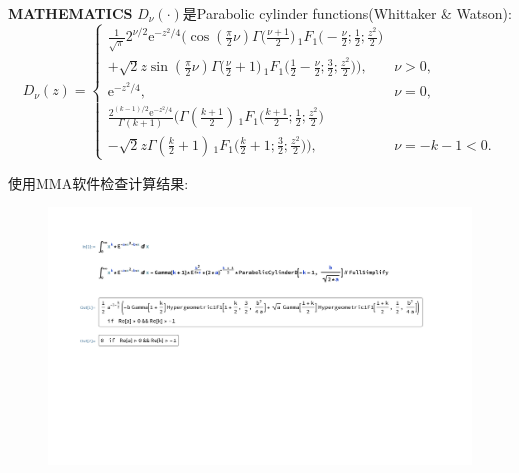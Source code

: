 \documentclass[aspectratio=169]{beamer}
\begin{document}
\begin{frame}{\textbf{{\LARGE{M}}ATHEMATICS}}
	$D_{\nu}(\cdot)$是Parabolic cylinder functions(Whittaker \& Watson):
	\begin{equation}
		D_{\nu}(z)=\begin{cases}
 \frac{1}{\sqrt{\pi}}2^{\nu/2}\mathrm{e}^{-z^2/4}\bigg( \cos(\frac{\pi}{2}\nu)\Gamma\Big(\frac{\nu+1}{2}\Big)\,_1F_1\Big(-\frac{\nu}{2};\frac{1}{2};\frac{z^2}{2}\Big)\\
		+\sqrt{2}z\sin(\frac{\pi}{2}\nu)\Gamma\Big(\frac{\nu}{2}+1\Big)\,_1F_1\Big(\frac{1}{2} - \frac{\nu}{2};\frac{3}{2};\frac{z^2}{2}\Big)\bigg),~~&\nu > 0,\\
		\mathrm{e}^{-z^2/4},~~&\nu=0,\\
		\frac{2^{(k-1)/2}\mathrm{e}^{-z^2/4}}{\Gamma(k+1)}\bigg(\Gamma(\frac{k+1}{2})\,_1F_1\Big(\frac{k+1}{2};\frac{1}{2};\frac{z^2}{2}\Big) \\
		-\sqrt{2}z\Gamma(\frac{k}{2}+1)\,_1F_1\Big(\frac{k}{2}+1;\frac{3}{2};\frac{z^2}{2}\Big)\bigg),~~&\nu=-k-1<0.
		\end{cases}
	\end{equation}
\end{frame}

\begin{frame}{使用MMA软件检查计算结果:}
    \begin{figure}
		\centering
		\includegraphics[width=1.0\linewidth, trim=70 0 100 0,clip]{images/print.pdf}
	\end{figure}
\end{frame}
\end{document}
